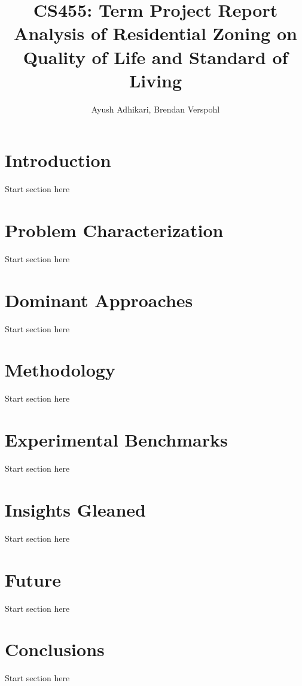\documentclass{article}
\begin{document}
\title{%
  CS455: Term Project Report \\
  \large Analysis of Residential Zoning on\\
    Quality of Life and Standard of Living}

\author{Ayush Adhikari, Brendan Verspohl}

\maketitle

\section{Introduction}
Start section here

\section{Problem Characterization}
Start section here

\section{Dominant Approaches}
Start section here

\section{Methodology}
Start section here

\section{Experimental Benchmarks}
Start section here

\section{Insights Gleaned}
Start section here

\section{Future}
Start section here

\section{Conclusions}
Start section here



\end{document}
